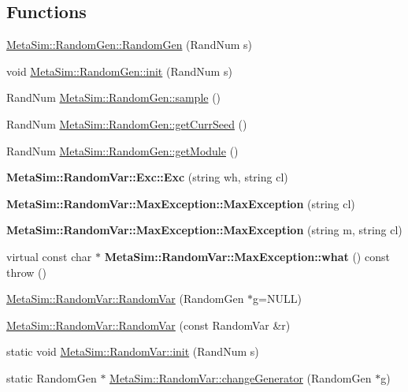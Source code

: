 \subsection*{Functions}
\begin{DoxyCompactItemize}
\item 
\hyperlink{group__metasim__random_gabaa90db3234c032b6650a1cffb523a55}{Meta\+Sim\+::\+Random\+Gen\+::\+Random\+Gen} (Rand\+Num s)
\item 
void \hyperlink{group__metasim__random_ga533a4ad9a71fafe04a6b25491cd38e0b}{Meta\+Sim\+::\+Random\+Gen\+::init} (Rand\+Num s)
\item 
Rand\+Num \hyperlink{group__metasim__random_ga94a34514116b265e8fd0bbbd35d662d9}{Meta\+Sim\+::\+Random\+Gen\+::sample} ()
\item 
Rand\+Num \hyperlink{group__metasim__random_gaa97fbc23d68f3fa5e35e87c8c09a9624}{Meta\+Sim\+::\+Random\+Gen\+::get\+Curr\+Seed} ()
\item 
Rand\+Num \hyperlink{group__metasim__random_gaac9729d6899351c58f6fd2684d0e62f8}{Meta\+Sim\+::\+Random\+Gen\+::get\+Module} ()
\item 
{\bfseries Meta\+Sim\+::\+Random\+Var\+::\+Exc\+::\+Exc} (string wh, string cl)\hypertarget{group__metasim__random_gada0552de367838edbddfb3e3cff56deb}{}\label{group__metasim__random_gada0552de367838edbddfb3e3cff56deb}

\item 
{\bfseries Meta\+Sim\+::\+Random\+Var\+::\+Max\+Exception\+::\+Max\+Exception} (string cl)\hypertarget{group__metasim__random_ga8c3643b6a8089b10f8a5571985086e46}{}\label{group__metasim__random_ga8c3643b6a8089b10f8a5571985086e46}

\item 
{\bfseries Meta\+Sim\+::\+Random\+Var\+::\+Max\+Exception\+::\+Max\+Exception} (string m, string cl)\hypertarget{group__metasim__random_gaaf779679462d5427eb0e2750f87bb505}{}\label{group__metasim__random_gaaf779679462d5427eb0e2750f87bb505}

\item 
virtual const char $\ast$ {\bfseries Meta\+Sim\+::\+Random\+Var\+::\+Max\+Exception\+::what} () const   throw ()\hypertarget{group__metasim__random_gaab0c7d52dfb90ee41c164e2a35230db9}{}\label{group__metasim__random_gaab0c7d52dfb90ee41c164e2a35230db9}

\item 
\hyperlink{group__metasim__random_ga465214e20898d424b2083c270361d161}{Meta\+Sim\+::\+Random\+Var\+::\+Random\+Var} (Random\+Gen $\ast$g=N\+U\+LL)
\item 
\hyperlink{group__metasim__random_ga22bc5cb0b21f5c0c72f0a15242c44a75}{Meta\+Sim\+::\+Random\+Var\+::\+Random\+Var} (const Random\+Var \&r)
\item 
static void \hyperlink{group__metasim__random_ga89cf38f1fd1b6cfd67ae022f6874f82e}{Meta\+Sim\+::\+Random\+Var\+::init} (Rand\+Num s)
\item 
static Random\+Gen $\ast$ \hyperlink{group__metasim__random_gaeb0c73814132d1d0631264ec94bbf9bc}{Meta\+Sim\+::\+Random\+Var\+::change\+Generator} (Random\+Gen $\ast$g)\hypertarget{group__metasim__random_gaeb0c73814132d1d0631264ec94bbf9bc}{}\label{group__metasim__random_gaeb0c73814132d1d0631264ec94bbf9bc}


\end{DoxyCompactItemize}
